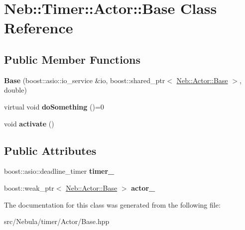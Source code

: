\hypertarget{classNeb_1_1Timer_1_1Actor_1_1Base}{\section{Neb\-:\-:Timer\-:\-:Actor\-:\-:Base Class Reference}
\label{classNeb_1_1Timer_1_1Actor_1_1Base}
}
\subsection*{Public Member Functions}
\begin{DoxyCompactItemize}
\item 
\hypertarget{classNeb_1_1Timer_1_1Actor_1_1Base_abf4fc9cbf5d86bd2c36da3a9d10f262d}{{\bfseries Base} (boost\-::asio\-::io\-\_\-service \&io, boost\-::shared\-\_\-ptr$<$ \hyperlink{classNeb_1_1Actor_1_1Base}{Neb\-::\-Actor\-::\-Base} $>$, double)}\label{classNeb_1_1Timer_1_1Actor_1_1Base_abf4fc9cbf5d86bd2c36da3a9d10f262d}

\item 
\hypertarget{classNeb_1_1Timer_1_1Actor_1_1Base_a8e1f81941a3720f925aa376ef2c260e0}{virtual void {\bfseries do\-Something} ()=0}\label{classNeb_1_1Timer_1_1Actor_1_1Base_a8e1f81941a3720f925aa376ef2c260e0}

\item 
\hypertarget{classNeb_1_1Timer_1_1Actor_1_1Base_a698df59a0dc7ebb6a8f0a0dfc45f2004}{void {\bfseries activate} ()}\label{classNeb_1_1Timer_1_1Actor_1_1Base_a698df59a0dc7ebb6a8f0a0dfc45f2004}

\end{DoxyCompactItemize}
\subsection*{Public Attributes}
\begin{DoxyCompactItemize}
\item 
\hypertarget{classNeb_1_1Timer_1_1Actor_1_1Base_a901f924d54f4d8c44244586a270df37e}{boost\-::asio\-::deadline\-\_\-timer {\bfseries timer\-\_\-}}\label{classNeb_1_1Timer_1_1Actor_1_1Base_a901f924d54f4d8c44244586a270df37e}

\item 
\hypertarget{classNeb_1_1Timer_1_1Actor_1_1Base_a365e4320c4de0c27fc7518a4e1e09f8e}{boost\-::weak\-\_\-ptr$<$ \hyperlink{classNeb_1_1Actor_1_1Base}{Neb\-::\-Actor\-::\-Base} $>$ {\bfseries actor\-\_\-}}\label{classNeb_1_1Timer_1_1Actor_1_1Base_a365e4320c4de0c27fc7518a4e1e09f8e}

\end{DoxyCompactItemize}


The documentation for this class was generated from the following file\-:\begin{DoxyCompactItemize}
\item 
src/\-Nebula/timer/\-Actor/Base.\-hpp\end{DoxyCompactItemize}
